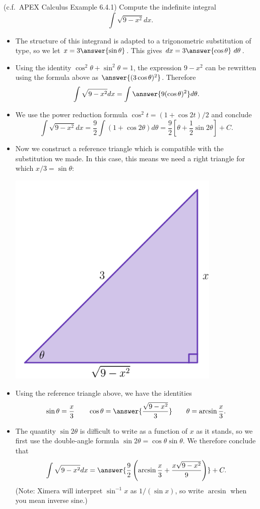 \documentclass{ximera}
\begin{document}
\begin{example}
(c.f.~APEX Calculus Example 6.4.1) Compute the indefinite integral
\[ \int \sqrt{9 - x^2} dx. \]
\begin{itemize}
\item The structure of this integrand is adapted to a trigonometric substitution of  type, so we let $x = 3 \answer{\sin \theta}$. This gives $dx = 3 \answer{\cos \theta}~d \theta$.
\item Using the identity $\cos^2 \theta + \sin^2 \theta = 1$, the expression $9 - x^2$ can be rewritten using the formula above as $\answer{(3 \cos \theta)^2}$. Therefore
\[ \int \sqrt{9-x^2} dx = \int \answer{9 (\cos \theta)^2} d \theta. \]
\item We use the power reduction formula $\cos^2 t = (1 + \cos 2t)/2$ and conclude
\[ \int \sqrt{9-x^2} dx = \frac{9}{2} \int \left( 1 + \cos 2 \theta \right) d \theta = \frac{9}{2} \left[ \theta + \frac{1}{2} \sin 2 \theta \right] + C. \]
\item Now we construct a reference triangle which is compatible with the substitution we made. In this case, this means we need a right triangle for which $x/3 = \sin \theta$:
\begin{center}
\begin{image}
\includegraphics[width=4in]{images/trigsub01.png}
\end{image}
\end{center}
\item Using the reference triangle above, we have the identities
\[ \sin \theta = \frac{x}{3} \qquad \cos \theta = \answer{ \frac{\sqrt{9-x^2}}{3}} \qquad \theta = \arcsin \frac{x}{3}. \]
\item The quantity $\sin 2 \theta$ is difficult to write as a function of $x$ as it stands, so we first use the double-angle formula $\sin 2 \theta = \cos \theta \sin \theta$. We therefore conclude that
\[ \int \sqrt{9-x^2} dx = \answer{ \frac{9}{2} \left( \arcsin \frac{x}{3} + \frac{x \sqrt{9-x^2}}{9} \right)} + C. \]
(Note: Ximera will interpret $\sin^{-1} x$ as $1/(\sin x)$, so write $\arcsin$ when you mean inverse sine.)
\end{itemize}
\end{example}
\end{document}
